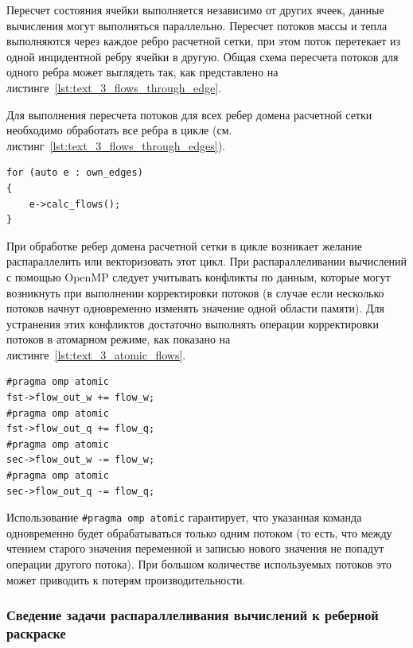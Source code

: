 Пересчет состояния ячейки выполняется независимо от других ячеек, данные вычисления могут выполняться параллельно.
Пересчет потоков массы и тепла выполняются через каждое ребро расчетной сетки, при этом поток перетекает из одной инцидентной ребру ячейки в другую.
Общая схема пересчета потоков для одного ребра может выглядеть так, как представлено на листинге~\ref{lst:text_3_flows_through_edge}.

Для выполнения пересчета потоков для всех ребер домена расчетной сетки необходимо обработать все ребра в цикле (см. листинг~\ref{lst:text_3_flows_through_edges}).

\begin{lstlisting}[caption={Расчет протекания потоков для всех ребер домена.}, label={lst:text_3_flows_through_edges}]
for (auto e : own_edges)
{
    e->calc_flows();
}
\end{lstlisting}

При обработке ребер домена расчетной сетки в цикле возникает желание распараллелить или векторизовать этот цикл.
При распараллеливании вычислений с помощью OpenMP следует учитывать конфликты по данным, которые могут возникнуть при выполнении корректировки потоков (в случае если несколько потоков начнут одновременно изменять значение одной области памяти).
Для устранения этих конфликтов достаточно выполнять операции корректировки потоков в атомарном режиме, как показано на листинге~\ref{lst:text_3_atomic_flows}.

\begin{lstlisting}[caption={Атомарные операции корректировки потоков.}, label={lst:text_3_atomic_flows}]
#pragma omp atomic
fst->flow_out_w += flow_w;
#pragma omp atomic
fst->flow_out_q += flow_q;
#pragma omp atomic
sec->flow_out_w -= flow_w;
#pragma omp atomic
sec->flow_out_q -= flow_q;
\end{lstlisting}

Использование \texttt{\#pragma omp atomic} гарантирует, что указанная команда одновременно будет обрабатываться только одним потоком (то есть, что между чтением старого значения переменной и записью нового значения не попадут операции другого потока).
При большом количестве используемых потоков это может приводить к потерям производительности.

\subsubsection{Сведение задачи распараллеливания вычислений к реберной раскраске}

